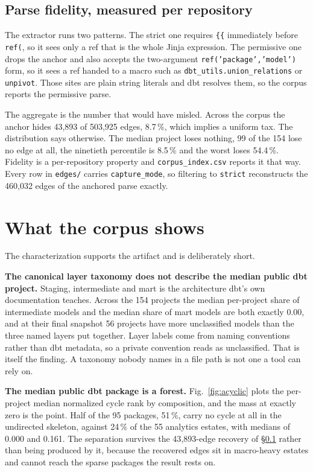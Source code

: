 \documentclass[10pt,conference]{IEEEtran}
\begin{document}
\subsection{Parse fidelity, measured per repository}
\label{sec:fidelity}

The extractor runs two patterns. The strict one requires \texttt{\{\{}
immediately before \texttt{ref(}, so it sees only a ref that is the whole Jinja
expression. The permissive one drops the anchor and also accepts the
two-argument \texttt{ref('package','model')} form, so it sees a ref handed to a
macro such as \texttt{dbt\_utils.union\_relations} or \texttt{unpivot}. Those
sites are plain string literals and dbt resolves them, so the corpus reports the
permissive parse.

The aggregate is the number that would have misled. Across the corpus the anchor
hides 43{,}893 of 503{,}925 edges, 8.7\,\%, which implies a uniform tax. The
distribution says otherwise. The median project loses nothing, 99 of the 154
lose no edge at all, the ninetieth percentile is 8.5\,\% and the worst loses
54.4\,\%. Fidelity is a per-repository
property and \texttt{corpus\_index.csv} reports it that way. Every row in
\texttt{edges/} carries \texttt{capture\_mode}, so filtering to \texttt{strict}
reconstructs the 460{,}032 edges of the anchored parse exactly.

\section{What the corpus shows}

The characterization supports the artifact and is deliberately short.

\textbf{The canonical layer taxonomy does not describe the median public dbt
project.} Staging, intermediate and mart is the architecture dbt's own
documentation teaches. Across the 154 projects the median per-project share of
intermediate models and the median share of mart models are both exactly 0.00,
and at their final snapshot 56 projects have more unclassified models than the
three named layers put together. Layer labels come from naming
conventions rather than dbt metadata, so a private convention reads as
unclassified. That is itself the finding. A taxonomy
nobody names in a file path is not one a tool can rely on.

\textbf{The median public dbt package is a forest.} Fig.~\ref{fig:acyclic} plots
the per-project median normalized cycle rank by composition, and the mass at
exactly zero is the point. Half of the 95 packages, 51\,\%, carry no cycle at
all in the undirected skeleton, against 24\,\% of the 55 analytics estates, with
medians of 0.000 and 0.161. The separation survives the 43{,}893-edge recovery
of \S\ref{sec:fidelity} rather than being produced by it, because the recovered
edges sit in macro-heavy estates and cannot reach the sparse packages the result
rests on.
\end{document}

